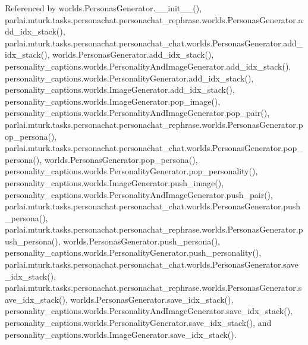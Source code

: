 Referenced by worlds.\+Personas\+Generator.\+\_\+\+\_\+init\+\_\+\+\_\+(), parlai.\+mturk.\+tasks.\+personachat.\+personachat\+\_\+rephrase.\+worlds.\+Personas\+Generator.\+add\+\_\+idx\+\_\+stack(), parlai.\+mturk.\+tasks.\+personachat.\+personachat\+\_\+chat.\+worlds.\+Personas\+Generator.\+add\+\_\+idx\+\_\+stack(), worlds.\+Personas\+Generator.\+add\+\_\+idx\+\_\+stack(), personality\+\_\+captions.\+worlds.\+Personality\+And\+Image\+Generator.\+add\+\_\+idx\+\_\+stack(), personality\+\_\+captions.\+worlds.\+Personality\+Generator.\+add\+\_\+idx\+\_\+stack(), personality\+\_\+captions.\+worlds.\+Image\+Generator.\+add\+\_\+idx\+\_\+stack(), personality\+\_\+captions.\+worlds.\+Image\+Generator.\+pop\+\_\+image(), personality\+\_\+captions.\+worlds.\+Personality\+And\+Image\+Generator.\+pop\+\_\+pair(), parlai.\+mturk.\+tasks.\+personachat.\+personachat\+\_\+rephrase.\+worlds.\+Personas\+Generator.\+pop\+\_\+persona(), parlai.\+mturk.\+tasks.\+personachat.\+personachat\+\_\+chat.\+worlds.\+Personas\+Generator.\+pop\+\_\+persona(), worlds.\+Personas\+Generator.\+pop\+\_\+persona(), personality\+\_\+captions.\+worlds.\+Personality\+Generator.\+pop\+\_\+personality(), personality\+\_\+captions.\+worlds.\+Image\+Generator.\+push\+\_\+image(), personality\+\_\+captions.\+worlds.\+Personality\+And\+Image\+Generator.\+push\+\_\+pair(), parlai.\+mturk.\+tasks.\+personachat.\+personachat\+\_\+chat.\+worlds.\+Personas\+Generator.\+push\+\_\+persona(), parlai.\+mturk.\+tasks.\+personachat.\+personachat\+\_\+rephrase.\+worlds.\+Personas\+Generator.\+push\+\_\+persona(), worlds.\+Personas\+Generator.\+push\+\_\+persona(), personality\+\_\+captions.\+worlds.\+Personality\+Generator.\+push\+\_\+personality(), parlai.\+mturk.\+tasks.\+personachat.\+personachat\+\_\+chat.\+worlds.\+Personas\+Generator.\+save\+\_\+idx\+\_\+stack(), parlai.\+mturk.\+tasks.\+personachat.\+personachat\+\_\+rephrase.\+worlds.\+Personas\+Generator.\+save\+\_\+idx\+\_\+stack(), worlds.\+Personas\+Generator.\+save\+\_\+idx\+\_\+stack(), personality\+\_\+captions.\+worlds.\+Personality\+And\+Image\+Generator.\+save\+\_\+idx\+\_\+stack(), personality\+\_\+captions.\+worlds.\+Personality\+Generator.\+save\+\_\+idx\+\_\+stack(), and personality\+\_\+captions.\+worlds.\+Image\+Generator.\+save\+\_\+idx\+\_\+stack().

\mbox{\label{classparlai_1_1mturk_1_1tasks_1_1personachat_1_1personachat__chat_1_1worlds_1_1PersonasGenerator_ac13e6005f73e2172b1e188bf7aa3debf}} 
